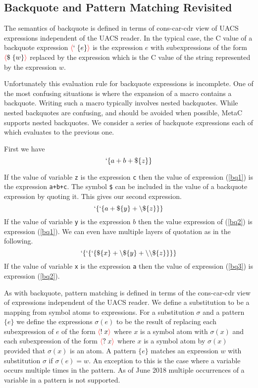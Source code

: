 \documentclass{article}
\newcommand{\fopen}{{\color{red} \langle}}
\newcommand{\fclose}{{\color{red} \rangle}}
\begin{document}
\subsection{Backquote and Pattern Matching Revisited}

The semantics of backquote is defined in terms of cons-car-cdr view of UACS expressions independent of the UACS reader.
In the typical case, the C value of a backquote expression
$\fopen ` \;\{e\}\fclose$ is the expression $e$ with subexpressions of the form $\fopen \$\;\{w\}\fclose$ replaced by the expression which is the C value of the string represented by the expression $w$.

Unfortunately this evaluation rule for backquote expressions is incomplete.  One of the most
confusing situations is where the expansion of a macro contains a backquote.  Writing such a macro typically involves nested backquotes.  While nested backquotes
are confusing, and should be avoided when possible, MetaC supports nested backquotes.  We consider a series of backquote expressions each of which evaluates to the previous one.

First we have
\begin{equation}
\label{bq1}
`\{a+b+\$\{z\}\}
\end{equation}

If the value of variable {\tt z} is the expression {\tt c} then the value of expression (\ref{bq1}) is the expression {\tt a+b+c}.
The symbol {\tt \$} can be included in the value of a backquote expression by quoting it.  This gives our second expression.
\begin{equation}
\label{bq2}
`\{`\{a + \$\{y\} + \backslash\$\{z\}\}\}
\end{equation}
If the value of variable {\tt y} is the expression $b$ then the value expression of (\ref{bq2}) is expression (\ref{bq1}).
We can even have multiple layers of quotation as in the following.
\begin{equation}
\label{bq3}
`\{`\{`\{\$\{x\} + \backslash\$\{y\} + \backslash\backslash\$\{z\}\}\}\}
\end{equation}
If the value of variable {\tt x} is the expression {\tt a} then the value of expression (\ref{bq3}) is expression (\ref{bq2}).

As with backquote, pattern matching is defined in terms of the cons-car-cdr view of expressions independent of the UACS reader.  We define a substitution to be a mapping from
symbol atoms to expressions. For a substitution $\sigma$ and a pattern $\{e\}$ we define the expressions $\sigma(e)$
to be the result of replacing each subexpression of $e$ of the form $\fopen !\;x \fclose$ where $x$ is a symbol atom with $\sigma(x)$ and each subexpression of the form
$\fopen ?\;x \fclose$ where $x$ is a symbol atom by $\sigma(x)$ provided that $\sigma(x)$ is an atom.  A pattern $\{e\}$ matches an expression $w$ with substitution $\sigma$
if $\sigma(e) = w$. An exception to this is the case where a variable occurs multiple times in the pattern.  As of June 2018 multiple occurrences of a variable in a pattern is not supported.
\end{document}
